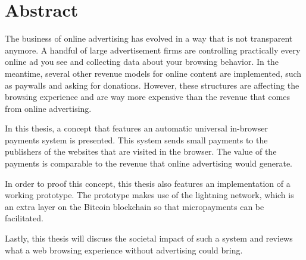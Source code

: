 \chapter*{Abstract}
\label{cha:abstract}
The business of online advertising has evolved in a way that is not transparent anymore. A handful of large advertisement firms are controlling practically every online ad you see and collecting data about your browsing behavior. In the meantime, several other revenue models for online content are implemented, such as paywalls and asking for donations. However, these structures are affecting the browsing experience and are way more expensive than the revenue that comes from online advertising. 

In this thesis, a concept that features an automatic universal in-browser payments system is presented. This system sends small payments to the publishers of the websites that are visited in the browser. The value of the payments is comparable to the revenue that online advertising would generate.

In order to proof this concept, this thesis also features an implementation of a working prototype. The prototype makes use of the lightning network, which is an extra layer on the Bitcoin blockchain so that micropayments can be facilitated.

Lastly, this thesis will discuss the societal impact of such a system and reviews what a web browsing experience without advertising could bring. 